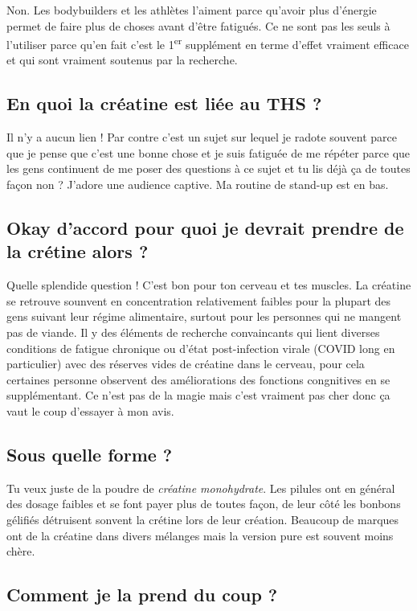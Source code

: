 \documentclass{article}
\newcommand{\ts}{\textsuperscript}
\begin{document}
Non. Les bodybuilders et les athlètes l'aiment parce qu'avoir plus d'énergie permet de faire plus de choses avant d'être fatigués. Ce ne sont pas les seuls à l'utiliser parce qu'en fait c'est le 1\ts{er} supplément en terme d'effet vraiment efficace et qui sont vraiment soutenus par la recherche.

\subsection{En quoi la créatine est liée au THS ?}

Il n'y a aucun lien ! Par contre c'est un sujet sur lequel je radote souvent parce que je pense que c'est une bonne chose et je suis fatiguée de me répéter parce que les gens continuent de me poser des questions à ce sujet et tu lis déjà ça de toutes façon non ? J'adore une audience captive. Ma routine de stand-up est en bas.

\subsection{Okay d'accord pour quoi je devrait prendre de la crétine alors ?}

Quelle splendide question ! C'est bon pour ton cerveau et tes muscles. La créatine se retrouve sounvent en concentration relativement faibles pour la plupart des gens suivant leur régime alimentaire, surtout pour les personnes qui ne mangent pas de viande. Il y des éléments de recherche convaincants qui lient diverses conditions de fatigue chronique ou d'état post-infection virale (COVID long en particulier) avec des réserves vides de créatine dans le cerveau, pour cela certaines personne observent des améliorations des fonctions congnitives en se supplémentant. Ce n'est pas de la magie mais c'est vraiment pas cher donc ça vaut le coup d'essayer à mon avis.

\subsection{Sous quelle forme ?}

Tu veux juste de la poudre de \textit{créatine monohydrate}. Les pilules ont en général des dosage faibles et se font payer plus de toutes façon, de leur côté les bonbons gélifiés détruisent sonvent la crétine lors de leur création. Beaucoup de marques ont de la créatine dans divers mélanges mais la version pure est souvent moins chère.

\subsection{Comment je la prend du coup ?}
\end{document}
